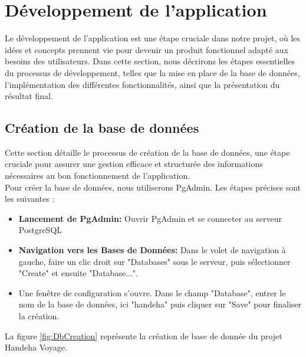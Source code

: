 \documentclass[12pt]{report}
\begin{document}
			\chapter{Développement de l’application}


			\hspace{15pt} Le développement de l'application est une étape cruciale dans notre projet, où les idées et concepts prennent vie pour devenir un produit fonctionnel adapté aux besoins des utilisateurs. Dans cette section, nous décrirons les étapes essentielles du processus de développement, telles que la mise en place de la base de données, l'implémentation des différentes fonctionnalités, ainsi que la présentation du résultat final.
		
			\section{Création de la base de données}
			
			\hspace{15pt} Cette section détaille le processus de création de la base de données, une étape cruciale pour assurer une gestion efficace et structurée des informations nécessaires au bon fonctionnement de l'application.\\

			Pour créer la base de données, nous utiliserons PgAdmin. Les étapes précises sont les suivantes :					

			\begin{itemize}
				\item \textbf{Lancement de PgAdmin:} Ouvrir PgAdmin et se connecter au serveur PostgreSQL
				\item \textbf{Navigation vers les Bases de Données:} Dans le volet de navigation à gauche, faire un clic droit sur "Databases" sous le serveur, puis sélectionner "Create" et ensuite "Database...".
				\item {} Une fenêtre de configuration s'ouvre. Dans le champ "Database", entrer le nom de la base de données, ici "handeha" puis cliquer sur "Save" pour finaliser la création.
			\end{itemize}

			La figure \ref{fig:DbCreation} représente la création de base de donnée du projet Handeha Voyage.
			
\end{document}
